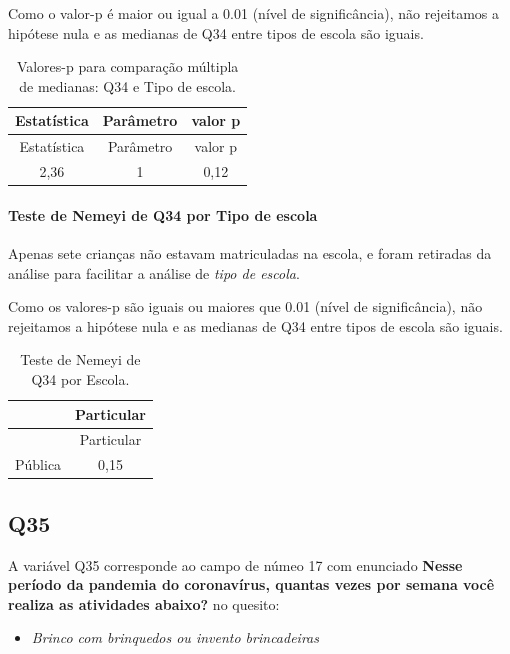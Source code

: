 \documentclass[]{article}
\providecommand{\tightlist}{%
  \setlength{\itemsep}{0pt}\setlength{\parskip}{0pt}}
\let\oldparagraph\paragraph
\renewcommand{\paragraph}[1]{\oldparagraph{#1}\mbox{}}
\begin{document}
Como o valor-p é maior ou igual a 0.01 (nível de significância), não rejeitamos a hipótese nula e as medianas de Q34 entre tipos de escola são iguais.

\begin{longtable}[]{@{}ccc@{}}
\caption{\label{tab:unnamed-chunk-1240}Valores-p para comparação múltipla de medianas: Q34 e Tipo de escola.}\tabularnewline
\toprule
Estatística & Parâmetro & valor p\tabularnewline
\midrule
\endfirsthead
\toprule
Estatística & Parâmetro & valor p\tabularnewline
\midrule
\endhead
2,36 & 1 & 0,12\tabularnewline
\bottomrule
\end{longtable}

\hypertarget{teste-de-nemeyi-de-q34-por-tipo-de-escola}{%
\paragraph{Teste de Nemeyi de Q34 por Tipo de escola}\label{teste-de-nemeyi-de-q34-por-tipo-de-escola}}

Apenas sete crianças não estavam matriculadas na escola, e foram retiradas da análise para facilitar a análise de \emph{tipo de escola}.

Como os valores-p são iguais ou maiores que 0.01 (nível de significância), não rejeitamos a hipótese nula e as medianas de Q34 entre tipos de escola são iguais.

\begin{longtable}[]{@{}lc@{}}
\caption{\label{tab:unnamed-chunk-1242}Teste de Nemeyi de Q34 por Escola.}\tabularnewline
\toprule
& Particular\tabularnewline
\midrule
\endfirsthead
\toprule
& Particular\tabularnewline
\midrule
\endhead
Pública & 0,15\tabularnewline
\bottomrule
\end{longtable}

\cleardoublepage

\hypertarget{q35}{%
\subsection{Q35}\label{q35}}

A variável Q35 corresponde ao campo de númeo 17 com enunciado \textbf{Nesse período da pandemia do coronavírus, quantas vezes por semana você realiza as atividades abaixo?} no quesito:

\begin{itemize}
\tightlist
\item
  \emph{Brinco com brinquedos ou invento brincadeiras}
\end{itemize}
\end{document}
